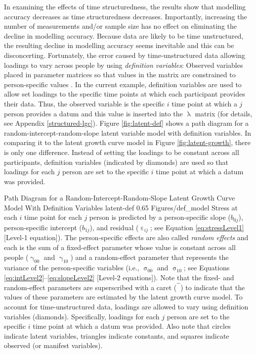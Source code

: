 \documentclass[
12pt, %
twoside,
english]{guelphthesis}
\begin{document}
In examining the effects of time structuredness, the results show that modelling accuracy decreases as time structuredness decreases. Importantly, increasing the number of measurements and/or sample size has no effect on eliminating the decline in modelling accuracy. Because data are likely to be time unstructured, the resulting decline in modelling accuracy seems inevitable and this can be disconcerting. Fortunately, the error caused by time-unstructured data allowing loadings to vary across people by using \emph{definition variables}: Observed variables placed in parameter matrices so that values in the matrix are constrained to person-specific values \autocite{mehta2000,mehta2005,blozis2008,sterba2014}. In the current example, definition variables are used to allow set loadings to the specific time points at which each participant provides their data. Thus, the observed variable is the specific \(i\) time point at which a \(j\) person provides a datum and this value is inserted into the \(\uplambda\) matrix (for details, see Appendix \ref{structured-lgc}). Figure \ref{fig:latent-def} shows a path diagram for a random-intercept-random-slope latent variable model with definition variables. In comparing it to the latent growth curve model in Figure \ref{fig:latent-growth}, there is only one difference. Instead of setting the loadings to be constant across all participants, definition variables (indicated by diamonds) are used so that loadings for each \(j\) person are set to the specific \(i\) time point at which a datum was provided.
\begin{apaFigure}
[portrait]
[samepage]
[-0.2cm]
{Path Diagram for a Random-Intercept-Random-Slope Latent Growth Curve Model With Definition Variables}
{latent-def}
{0.65}
{Figures/def_model}
{Stress at each $i$ time point for each $j$ person is predicted by a person-specific slope ($b_{0j}$), person-specific intercept ($b_{1j}$), and residual ($\upepsilon_{ij}$; see Equation \ref{eq:stressLevel1} [Level-1 equation]). The person-specific effects are also called \textit{random effects} and each is the sum of a fixed-effect parameter whose value is constant across all people ($\upgamma_{00}$ and $\upgamma_{10}$) and a random-effect parameter that represents the variance of the person-specific variables (i.e., $\upsigma_{00}$ and $\upsigma_{10}$; see Equations \ref{eq:intLevel2}--\ref{eq:slopeLevel2} [Level-2 equations]). Note that the fixed- and random-effect parameters are superscribed with a caret ($\hat{\phantom{\beta}}$) to indicate that the values of these parameters are estimated by the latent growth curve model. To account for time-unstructured data, loadings are allowed to vary using definition variables (diamonds). Specifically, loadings for each $j$ person are set to the specific $i$ time point at which a datum was provided. Also note that circles indicate latent variables, triangles indicate constants, and squares indicate observed (or manifest variables).}
\end{apaFigure}
\end{document}
